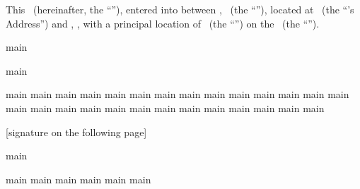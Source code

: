 This \lease\ (hereinafter, the ``''), entered into between \lessorName, \lessorType\ (the ``''), located at \lessorAddress\ (the ``\lessor's Address'') and \lesseeName, \lesseeType, with a principal location of \lesseeAddress\ (the ``'') on the \effectiveDateText\ (the ``'').

{main}

\clearpage
\tableofcontents
\newpage

{main}

{main}
{main}
{main}
{main}
{main}
{main}
{main}
{main}
{main}
{main}
{main}
{main}
{main}
{main}
{main}
{main}
{main}
{main}
{main}
{main}
{main}
{main}
{main}
{main}
{main}
{main}
{main}

\bigskip
\begin{center}
[signature on the following page]
\end{center}
\newpage
{main}

{main}
{main}
{main}
{main}
{main}
{main}
